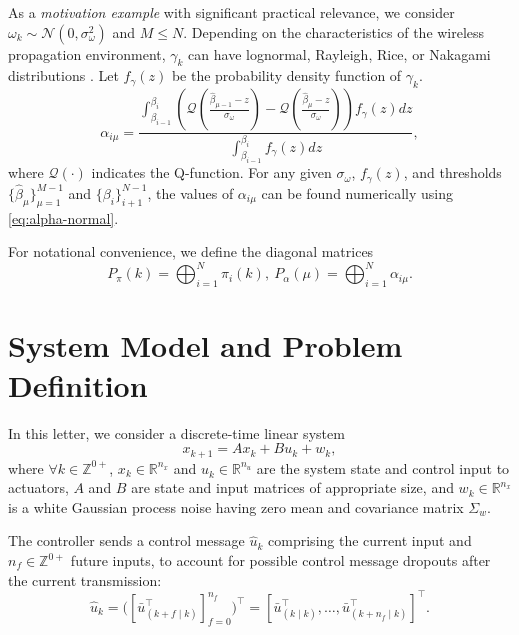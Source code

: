 \documentclass[journal,twoside,web]{ieeecolor}
\begin{document}
As a \emph{motivation example} with significant practical relevance, we consider $\omega_k \sim \mathcal{N}(0,\sigma_{\omega}^2)$ and $M\leq N$. 
Depending on the characteristics of the wireless propagation environment, $\gamma_k$ can have lognormal, Rayleigh, Rice, or Nakagami distributions \cite{stuber2017principles}. 
Let $f_{\gamma}(z)$ be the probability density function of $\gamma_k$.
\begin{equation}\label{eq:alpha-normal}
    \alpha_{i\mu} = \frac{
    \int_{\beta_{i-1}}^{\beta_{i}}\left(
    \mathcal{Q}\left(\frac{\hat{\beta}_{\mu-1}-z}{\sigma_{\omega}}\right) - 
    \mathcal{Q}\left(\frac{\hat{\beta}_{\mu}-z}{\sigma_{\omega}}\right) 
    \right) f_{\gamma}(z)dz}{
    \int_{\beta_{i-1}}^{\beta_{i}} f_{\gamma}(z)dz},
\end{equation}
where $\mathcal{Q}(\cdot)$ indicates the Q-function. For any given $\sigma_{\omega}$, $f_{\gamma}(z)$, and %
thresholds $\{\hat{\beta}_{\mu}\}_{\mu=1}^{M-1}$ and $\{\beta_{i}\}_{i+1}^{N-1}$, the values of $\alpha_{i\mu}$ can be found numerically using \eqref{eq:alpha-normal}.

For notational convenience, we define the diagonal matrices
\begin{equation}\label{eq:diag-prob}
     P_{\pi}^{}(k) = \bigoplus_{i=1}^{N} \pi_{i}(k),~P_{\alpha}^{}(\mu) = \bigoplus_{i=1}^{N} \alpha_{i\mu}.
\end{equation}

\section{System Model and Problem Definition}\label{sec:model}
In this letter, we consider a discrete-time linear system %
\begin{equation}\label{eq:state}
        x_{k+1} = A x_{k} + B u_{k}^{} + w_{k},
\end{equation}
where $\forall k \!\in\! \mathbb{Z}^{0+}$, $x_k\!\in\!\mathbb{R}^{n_x}$ and $u_k^{}\!\in\!\mathbb{R}^{n_u}$ are the system state and control input to actuators, $A$ and $B$ are state and input matrices of appropriate size, and $w_k\!\in\!\mathbb{R}^{n_x}$ is a white Gaussian process noise having zero mean and covariance matrix $\Sigma_w$.

The controller sends a control message $\hat{u}_k$ comprising the current input and $n_{f}\in\mathbb{Z}^{0+}$ future inputs, to account for possible control message dropouts after the current transmission: 
\begin{equation}\label{eq:control-message}
    \hat{u}_k =
    \big([\bar{u}_{(k+f\mid k)}^{\top}]_{f=0}^{n_f}\big)^{\!\top} = 
    [\bar{u}_{(k\mid k)}^{\top},\dots,\bar{u}_{(k+n_f\mid k)}^{\top}]^{\top}.
\end{equation}
\end{document}

